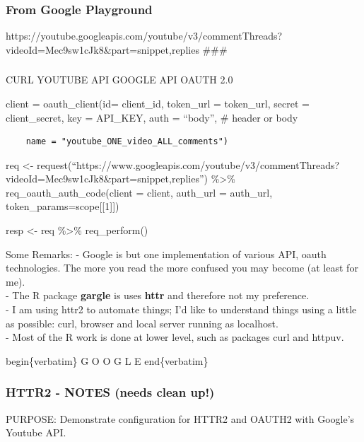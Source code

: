 \documentclass[
  letterpaper,
  DIV=11,
  numbers=noendperiod]{scrartcl}
\begin{document}
\subsubsection{From Google Playground}\label{from-google-playground}

https://youtube.googleapis.com/youtube/v3/commentThreads?videoId=Mec9sw1cJk8\&part=snippet,replies
\#\#\#

\subsubsection{}\label{section-3}

CURL \textbar{} YOUTUBE API \textbar{} GOOGLE API \textbar{} OAUTH 2.0
\textbar{}

client = oauth\_client(id= client\_id, token\_url = token\_url, secret =
client\_secret, key = API\_KEY, auth = ``body'', \# header or body

\begin{verbatim}
    name = "youtube_ONE_video_ALL_comments")
\end{verbatim}

req \textless-
request(``https://www.googleapis.com/youtube/v3/commentThreads?videoId=Mec9sw1cJk8\&part=snippet,replies'')
\%\textgreater\% req\_oauth\_auth\_code(client = client, auth\_url =
auth\_url, token\_params=scope{[}{[}1{]}{]})

resp \textless- req \%\textgreater\% req\_perform()

Some Remarks: - Google is but one implementation of various API, oauth
technologies. The more you read the more confused you may become (at
least for me).\\
- The R package \textbf{gargle} is uses \textbf{httr} and therefore not
my preference.\\
- I am using httr2 to automate things; I'd like to understand things
using a little as possible: curl, browser and local server running as
localhost.\\
- Most of the R work is done at lower level, such as packages curl and
httpuv.

begin\{verbatim\} G O O G L E end\{verbatim\}

\subsubsection{HTTR2 - NOTES (needs clean
up!)}\label{httr2---notes-needs-clean-up}

PURPOSE: Demonstrate configuration for HTTR2 and OAUTH2 with Google's
Youtube API.
\end{document}
